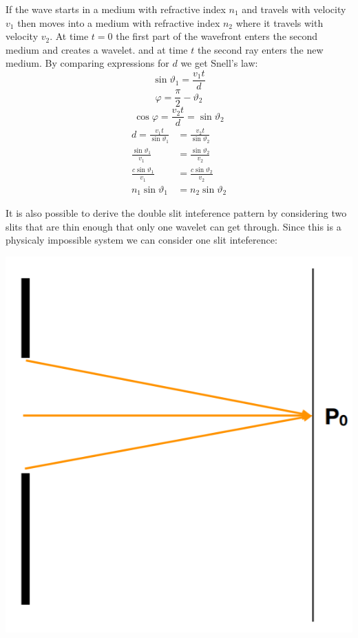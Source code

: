 \documentclass{article}
\begin{document}
If the wave starts in a medium with refractive index \(n_1\) and travels with velocity \(v_1\) then moves into a medium with refractive index \(n_2\) where it travels with velocity \(v_2\). At time \(t=0\) the first part of the wavefront enters the second medium and creates a wavelet. and at time \(t\) the second ray enters the new medium. By comparing expressions for \(d\) we get Snell's law:
\[\sin \vartheta_1=\frac{v_1t}{d}\]
\[\varphi = \frac{\pi}{2}-\vartheta_2\]
\[\cos\varphi=\frac{v_2t}{d}=\sin\vartheta_2\]
\begin{align*}
d=\frac{v_1t}{\sin\vartheta_1}&=\frac{v_2t}{\sin\vartheta_2}\\
\frac{\sin\vartheta_1}{v_1}&=\frac{\sin\vartheta_2}{v_2}\\
\frac{c\sin\vartheta_1}{v_1}&=\frac{c\sin\vartheta_2}{v_2}\\
n_1\sin\vartheta_1&=n_2\sin\vartheta_2
\end{align*}

It is also possible to derive the double slit inteference pattern by considering two slits that are thin enough that only one wavelet can get through. Since this is a physicaly impossible system we can consider one slit inteference:

\begin{center}
\includegraphics[scale=0.3]{SingleSlit1}
\end{center}
\end{document}
